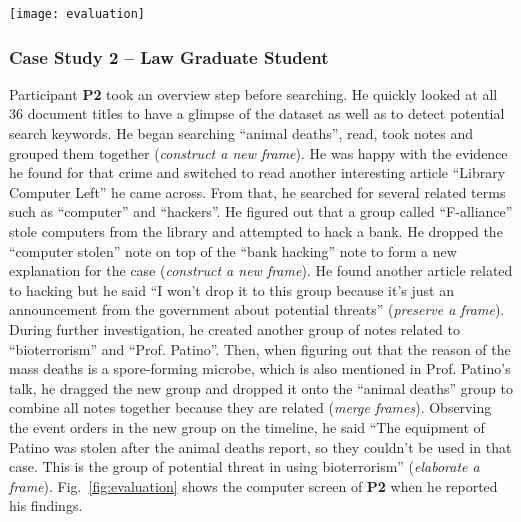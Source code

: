 \begin{figure*}[ht]
\centering
\texttt{[image: evaluation]}
\caption{A reproduced image from the video record of participant \textbf{P2} when he reported his findings. Top: a trail of his keyword searches, collapsed after being read. Middle: search results in index-card metaphor. Bottom: two schemata containing notes as supporting evidence of criminal activities he found.}
\label{fig:evaluation}
\end{figure*}

\subsubsection{Case Study 2 -- Law Graduate Student}
Participant \textbf{P2} took an overview step before searching. He quickly looked at all 36 document titles to have a glimpse of the dataset as well as to detect potential search keywords. He began searching ``animal deaths'', read, took notes and grouped them together (\textit{construct a new frame}). He was happy with the evidence he found for that crime and switched to read another interesting article ``Library Computer Left'' he came across. From that, he searched for several related terms such as ``computer'' and ``hackers''. He figured out that a group called ``F-alliance'' stole computers from the library and attempted to hack a bank. He dropped the ``computer stolen'' note on top of the ``bank hacking'' note to form a new explanation for the case (\textit{construct a new frame}). He found another article related to hacking but he said ``I won't drop it to this group because it's just an announcement from the government about potential threats'' (\textit{preserve a frame}). During further investigation, he created another group of notes related to ``bioterrorism'' and ``Prof. Patino''. Then, when figuring out that the reason of the mass deaths is a spore-forming microbe, which is also mentioned in Prof. Patino's talk, he dragged the new group and dropped it onto the ``animal deaths'' group to combine all notes together because they are related (\textit{merge frames}). Observing the event orders in the new group on the timeline, he said ``The equipment of Patino was stolen after the animal deaths report, so they couldn't be used in that case. This is the group of potential threat in using bioterrorism'' (\textit{elaborate a frame}). Fig.~\ref{fig:evaluation} shows the computer screen of \textbf{P2} when he reported his findings.

